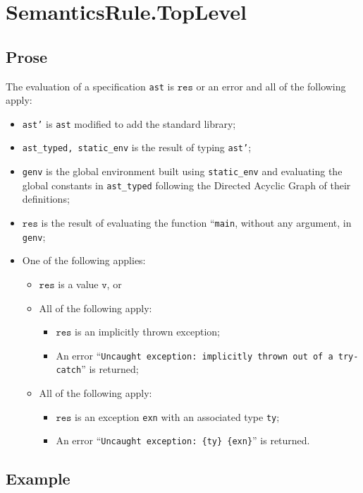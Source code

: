 \documentclass{book}
\newcommand\vv[0]{\texttt{v}}
\newcommand\vres[0]{\texttt{res}}
\begin{document}
  \section{SemanticsRule.TopLevel \label{sec:SemanticsRule.TopLevel}}

  \subsection{Prose}
  The evaluation of a specification \texttt{ast} is $\vres$ or an error
  and all of the following apply:
  \begin{itemize}
  \item \texttt{ast’} is \texttt{ast} modified to add the standard library;
  \item \texttt{ast\_typed, static\_env} is the result of typing \texttt{ast’};
  \item \texttt{genv} is the global environment built using \texttt{static\_env} and evaluating the global constants in \texttt{ast\_typed} following the Directed Acyclic Graph of their definitions;
  \item $\vres$ is the result of evaluating the function ``\texttt{main}, without any argument, in \texttt{genv};
  \item One of the following applies:
        \begin{itemize}
	\item $\vres$ is a value $\vv$, or
	\item All of the following apply:
              \begin{itemize}
              \item $\vres$ is an implicitly thrown exception;
	      \item An error ``\texttt{Uncaught exception: implicitly thrown out of a try-catch}'' is returned;
              \end{itemize}
	\item All of the following apply:
              \begin{itemize}
              \item $\vres$ is an exception \texttt{exn} with an associated type \texttt{ty};
	      \item An error ``\texttt{Uncaught exception: \{ty\} \{exn\}}'' is returned.
              \end{itemize}
        \end{itemize}
  \end{itemize}

  \subsection{Example}
\end{document}
